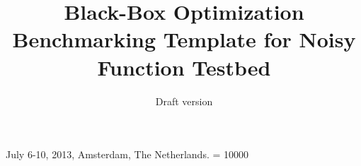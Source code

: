 \documentclass{sig-alternate}
\begin{document}
%
 {July 6-10, 2013, Amsterdam, The Netherlands.}
\widowpenalty = 10000

\title{Black-Box Optimization Benchmarking Template for Noisy Function
Testbed
}
\subtitle{Draft version
}

%
%
%
%
%
\end{document}

